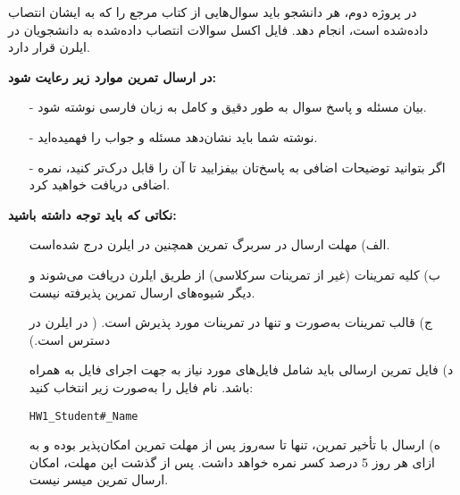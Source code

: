 در پروژه دوم، هر دانشجو باید سوال‌هایی از کتاب مرجع را که به ایشان انتصاب داده‌شده است، انجام دهد. فایل اکسل سوالات انتصاب داده‌شده به دانشجویان در ایلرن قرار دارد.

\textbf{در ارسال تمرین موارد زیر رعایت شود:}

\begin{itemize}
	\item[-]
	 بیان مسئله و پاسخ سوال به طور دقیق و کامل به زبان فارسی نوشته شود.

	\item[-]	
	 نوشته شما باید نشان‌دهد مسئله و جواب را فهمیده‌اید.
	
	\item[-]	
	اگر بتوانید توضیحات اضافی به پاسخ‌تان بیفزایید تا آن را قابل‌ درک‌تر کنید، نمره اضافی دریافت خواهید کرد.
\end{itemize}

\textbf{نکاتی که باید توجه داشته باشید:}

\begin{itemize}
	\item[الف)]
	مهلت ارسال در سربرگ تمرین همچنین در ایلرن درج شده‌است.
	\item[ب)]
	کلیه تمرینات (غیر از تمرینات سرکلاسی) از طریق ایلرن دریافت می‌شوند و دیگر شیوه‌های ارسال تمرین پذیرفته نیست.
	\item[ج)]
	قالب تمرینات به‌صورت \lr{\LaTeX} و تنها در  تمرینات مورد پذیرش است. ( در ایلرن در دسترس است.)
	\item[د)]	
	فایل تمرین ارسالی باید شامل فایل‌های مورد نیاز به جهت اجرای فایل \lr{\LaTeX} به همراه  باشد. نام فايل را به‌صورت زير انتخاب كنيد:

\begin{latin} \begin{center}
		\texttt{HW1\_Student\#\_Name}
	\end{center}
\end{latin}

	\item[ه)]
	ارسال با تأخیر تمرین، تنها تا سه‌روز پس از مهلت تمرین امکان‌پذیر بوده و به ازای هر روز 5 درصد کسر نمره خواهد داشت. پس از گذشت این مهلت، امکان ارسال تمرین میسر نیست.
\end{itemize}
